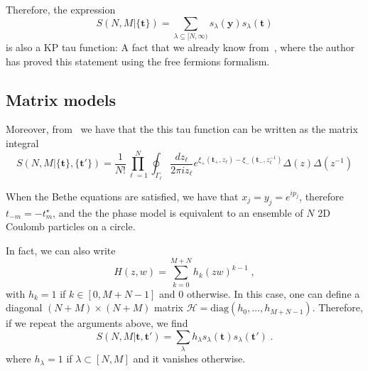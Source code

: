 \documentclass[a4paper,11pt]{amsart}
\begin{document}
Therefore, the expression
\begin{equation}
 S(N,M|\{\bm{t}\}) = \sum_{\lambda \subseteq [N, \infty)} s_\lambda(\bm{y})  s_\lambda(\bm{t}) 
\end{equation}
is also a KP tau function: A fact that we already know
from~\cite{Wheeler:2010vmq}, where the author has proved this
statement using the free fermions formalism.


\subsection{Matrix models}

Moreover, from~\cite{Zabrodin:2010ii} we have that the this tau
function can be written as the matrix integral
\begin{equation}
  S(N,M|\{\bm{t}\}, \{\bm{t}'\}) =
  \frac{1}{N!} \prod_{\ell=1}^N \oint_{\Gamma_\ell} \frac{dz_\ell}{2 \pi i z_\ell}
  e^{\xi_+(\bm{t}_+, z_\ell) - \xi_-(\bm{t}_-, z_{\ell}^{-1})} \Delta(z)\Delta(z^{-1})
\end{equation}

When the Bethe equations are satisfied, we have that \(x_j = y_j = e^{ip_j}\),
therefore \(t_{-m} = - t_m^\star\), and the the phase model is equivalent to
an ensemble of \(N\) 2D Coulomb particles on a circle. 


In fact, we can also write
\begin{equation}
  H(z,w) = \sum_{k=0}^{M+N} h_k(zw)^{k-1} \; , 
\end{equation}
with \(h_k=1\) if \(k\in [0, M+N-1]\) and \(0\) otherwise. In this
case, one can define a diagonal \((N+M)\times (N+M)\) matrix
\(\mathcal{H} = \textrm{diag}(h_0, \dots, h_{M+N-1})\). Therefore, if
we repeat the arguments above, we find
\begin{equation}
S(N, M|\bm{t}, \bm{t}') = \sum_{\lambda} h_\lambda s_\lambda(\bm{t}) s_\lambda(\bm{t}') \; .
\end{equation}
where \(h_\lambda = 1\) if \(\lambda \subset [N,M]\) and it vanishes otherwise. 



\end{document}
